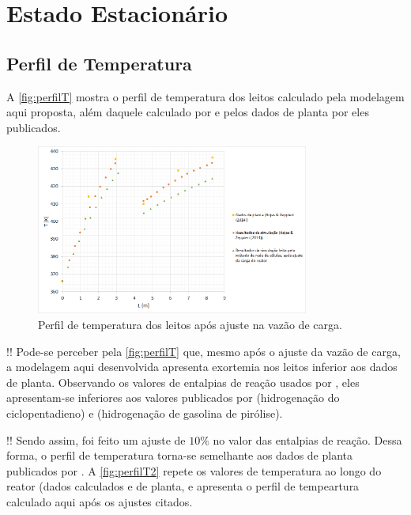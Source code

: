 \section{Estado Estacionário} \label{sec:estadoestacionario}

\subsection{Perfil de Temperatura} \label{sec:perfildetemperatura}

A \autoref{fig:perfilT} mostra o perfil de temperatura dos leitos
calculado pela modelagem aqui proposta, além daquele calculado por
 e pelos dados de planta por eles publicados.  

\begin{figure}[htb]
\centering \includegraphics[width=0.8\textwidth]{images/Chap4/perfilT.png}
\caption{Perfil de temperatura dos leitos após ajuste na vazão de carga.}
\label{fig:perfilT}
\end{figure}

!! Pode-se perceber pela \autoref{fig:perfilT} que, mesmo após o ajuste da vazão
de carga, a modelagem aqui desenvolvida apresenta exortemia nos leitos inferior aos
dados de planta. Observando os valores de entalpias de reação usados por
, eles apresentam-se inferiores aos valores publicados
por  (hidrogenação do ciclopentadieno) e
 (hidrogenação de gasolina de pirólise).

!! Sendo assim, foi feito um ajuste de $10 \%$ no valor das entalpias de reação.
Dessa forma, o perfil de temperatura torna-se semelhante aos dados de planta
publicados por . A \autoref{fig:perfilT2} repete os
valores de temperatura ao longo do reator (dados calculados e de planta, e
apresenta o perfil de tempeartura calculado aqui após os ajustes citados.

